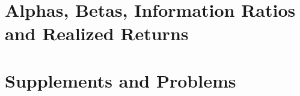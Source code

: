 \section{Alphas, Betas, Information Ratios and Realized Returns}







































\section{Supplements and Problems} 

